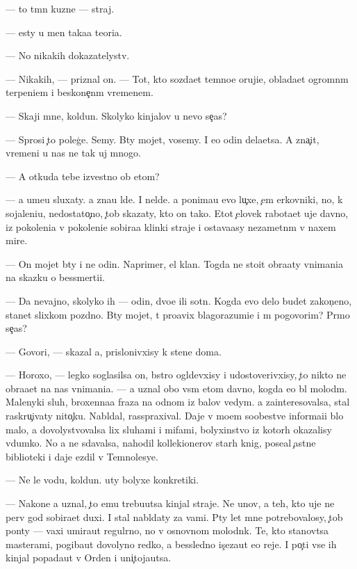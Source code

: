 \documentclass[10pt]{book}
\begin{document}
— {\C}to t{\e}mn{\yi}{\y} kuzne{\q} — straj.

— {\Y}esty u men{\ia} taka{\y}a teori{\y}a.

— No nikakih dokazatelystv.

— Nikakih, — priznal on. — Tot, kto sozda{\y}et temno{\y}e oruji{\y}e, oblada{\y}et ogromn{\yi}m terpeni{\y}em i beskone{\c}n{\yi}m vremenem.

— Skaji mne, koldun. Skolyko kinjalov u nevo se{\y}{\c}as?

— Sprosi {\c}to poleg{\c}e. Semy. B{\yi}ty mojet, vosemy. I {\y}e{\x}o odin dela{\y}etsa. A zna{\c}it, vremeni u nas ne tak uj mnogo.

— A otkuda tebe izvestno ob etom?

— {\Y}a ume{\y}u sluxaty. {\Y}a zna{\y}u l{\iu}de{\y}. I nel{\iu}de{\y}. {\Y}a ponima{\y}u {\y}evo lu{\c}xe, {\c}em {\q}erkovniki, no, k sojaleni{\y}u, nedostato{\c}no, {\c}tob{\yi} skazaty, kto on tako{\y}. Etot {\c}elovek rabota{\y}et uje davno, iz pokoleni{\y}a v pokoleni{\y}e sobira{\y}a klinki straje{\y} i ostava{\y}asy nezametn{\yi}m v naxem mire.

— On mojet b{\yi}ty i ne odin. Naprimer, {\q}el{\yi}{\y} klan. Togda ne sto{\y}it obra{\x}aty vnimani{\y}a na skazku o bessmerti{\y}i.

— Da nevajno, skolyko ih — odin, dvo{\y}e ili sotn{\ia}. Kogda {\y}evo delo budet zakon{\c}eno, stanet slixkom pozdno. B{\yi}ty mojet, t{\yi} pro{\y}avix blagorazumi{\y}e i m{\yi} pogovorim? Pr{\ia}mo se{\y}{\c}as?

— Govori, — skazal {\y}a, prislonivxisy k stene doma.

— Horoxo, — legko soglasilsa on, b{\yi}stro ogl{\ia}devxisy i udostoverivxisy, {\c}to nikto ne obra{\x}a{\y}et na nas vnimani{\y}a. — {\Y}a uznal obo vs{\e}m etom davno, kogda {\y}e{\x}o b{\yi}l molod{\yi}m. Malenyki{\y} sluh, broxenna{\y}a fraza na odnom iz balov vedym. {\Y}a za{\y}interesovalsa, stal raskru{\c}ivaty nito{\c}ku. Nabl{\iu}dal, rasspraxival. Daje v mo{\y}em soob{\x}estve informa{\q}i{\y}i b{\yi}lo malo, {\y}a dovolystvovalsa lix sluhami i mifami, bolyxinstvo iz kotor{\yi}h okazalisy v{\yi}dumko{\y}. No {\y}a ne sdavalsa, nahodil kollek{\q}ionerov star{\yi}h knig, pose{\x}al {\c}astn{\yi}{\y}e biblioteki i daje {\y}ezdil v Temnolesye.

— Ne le{\y} vodu, koldun. {\C}uty bolyxe konkretiki.

— Nakone{\q} {\y}a uznal, {\c}to {\y}emu trebu{\y}utsa kinjal{\yi} straje{\y}. Ne {\y}un{\q}ov, a teh, kto uje ne perv{\yi}{\y} god sobira{\y}et duxi. I stal nabl{\iu}daty za vami. P{\ia}ty let mne potrebovalosy, {\c}tob{\yi} pon{\ia}ty — vaxi umira{\y}ut regul{\ia}rno, no v osnovnom molodn{\ia}k. Te, kto stanov{\ia}tsa masterami, pogiba{\y}ut dovolyno redko, a bessledno is{\c}eza{\y}ut {\y}e{\x}o reje. I po{\c}ti vse ih kinjal{\yi} popada{\y}ut v Orden i uni{\c}toja{\y}utsa.
\end{document}
